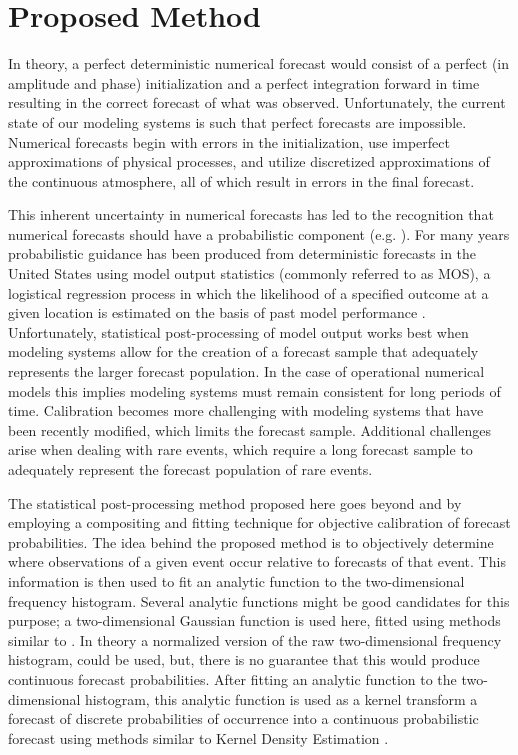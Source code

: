 

\chapter{Proposed Method}
\label{method}

In theory, a perfect deterministic numerical forecast would consist of a perfect (in amplitude and phase) initialization and a perfect integration forward in time resulting in the correct forecast of what was observed. Unfortunately, the current state of our modeling systems is such that perfect forecasts are impossible. Numerical forecasts begin with errors in the initialization, use imperfect approximations of physical processes, and utilize discretized approximations of the continuous atmosphere, all of which result in errors in the final forecast.

This inherent uncertainty in numerical forecasts has led to the recognition that numerical forecasts should have a probabilistic component (e.g. \citealp{Glahn1972, Murphy1993, Glahn2009}). For many years probabilistic guidance has been produced from deterministic forecasts in the United States using model output statistics (commonly referred to as MOS), a logistical regression process in which the likelihood of a specified outcome at a given location is estimated on the basis of past model performance \citep{Glahn1972}. Unfortunately, statistical post-processing of model output works best when modeling systems allow for the creation of a forecast sample that adequately represents the larger forecast population. In the case of operational numerical models this implies modeling systems must remain consistent for long periods of time. Calibration becomes more challenging with modeling systems that have been recently modified, which limits the forecast sample. Additional challenges arise when dealing with rare events, which require a long forecast sample to adequately represent the forecast population of rare events.

The statistical post-processing method proposed here goes beyond \cite{Theis2005} and \cite{Sobash2011} by employing a compositing and fitting technique for objective calibration of forecast probabilities. The idea behind the proposed method is to objectively determine where observations of a given event occur relative to forecasts of that event. This information is then used to fit an analytic function to the two-dimensional frequency histogram. Several analytic functions might be good candidates for this purpose; a two-dimensional Gaussian function is used here, fitted using methods similar to \cite{Lak2010}. In theory a normalized version of the raw two-dimensional frequency histogram, could be used, but, there is no guarantee that this would produce continuous forecast probabilities. After fitting an analytic function to the two-dimensional histogram, this analytic function is used as a kernel transform a forecast of discrete probabilities of occurrence into a continuous probabilistic forecast using methods similar to Kernel Density Estimation \citep{Silverman1986}.




